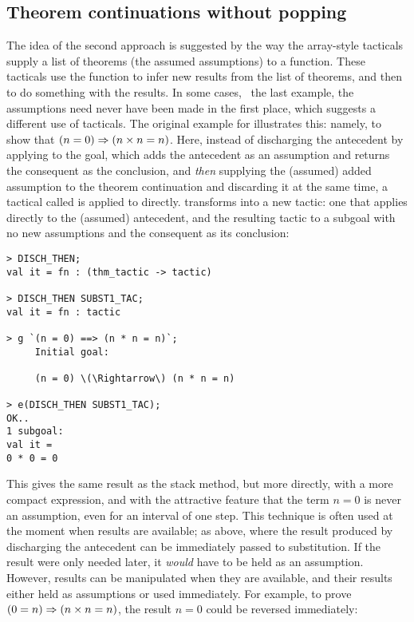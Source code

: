 \subsection{Theorem continuations without popping}
\label{tacont}

The idea of the second approach is suggested by the way the array-style tacticals supply a list of theorems (the assumed assumptions) to a function.
These tacticals use the function to infer new results from the list of theorems, and then to do something with the results.
In some cases, \eg\ the last example, the assumptions need never have been made in the first place, which suggests a different use of tacticals.
The original example for  illustrates this: namely, to show that $(n = 0) \Rightarrow (n\times n = n)$.
Here, instead of discharging the antecedent by applying  to the goal, which adds the antecedent as an assumption and returns the consequent as the conclusion, and {\it then\/} supplying the (assumed) added assumption to the theorem continuation  and discarding it at the same time, a tactical called  is applied to  directly.
 transforms  into a new tactic: one that applies  directly to the (assumed) antecedent, and the resulting tactic to a subgoal with no new assumptions and the consequent as its conclusion:

\setcounter{sessioncount}{1}
\begin{session}
\begin{verbatim}
> DISCH_THEN;
val it = fn : (thm_tactic -> tactic)

> DISCH_THEN SUBST1_TAC;
val it = fn : tactic

> g `(n = 0) ==> (n * n = n)`;
     Initial goal:

     (n = 0) \(\Rightarrow\) (n * n = n)

> e(DISCH_THEN SUBST1_TAC);
OK..
1 subgoal:
val it =
0 * 0 = 0
\end{verbatim}
\end{session}

\noindent This gives the same result as the stack method, but more
directly, with a more compact \ML{} expression,
and with the attractive feature that the term
$n=0$ is never an assumption, even for an interval of one step.
This technique is often used at the moment when results are available;
as above, where the result produced by discharging the antecedent can be
immediately passed to substitution. If the result were only needed
later, it {\it would\/} have to be held as an assumption. However, results
can be manipulated when they are available, and their results
either held as assumptions or used immediately.
For example, to prove $(0=n) \Rightarrow (n \times n = n)$,
the result $n=0$ could be reversed
immediately:

